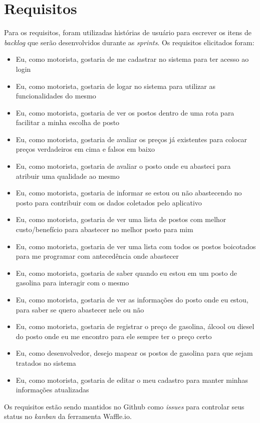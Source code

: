 \section{Requisitos}

Para os requisitos, foram utilizadas histórias de usuário para escrever os itens de \textit{backlog} que serão desenvolvidos durante as \textit{sprints}. Os requisitos elicitados foram:
\begin{itemize}
    \item Eu, como motorista, gostaria de me cadastrar no sistema para ter acesso ao login 
    \item Eu, como motorista, gostaria de logar no sistema para utilizar as funcionalidades do mesmo
    \item Eu, como motorista, gostaria de ver os postos dentro de uma rota para facilitar a minha escolha de posto
    \item Eu, como motorista, gostaria de avaliar os preços já existentes para colocar preços verdadeiros em cima e falsos em baixo
    \item Eu, como motorista, gostaria de avaliar o posto onde eu abasteci para atribuir uma qualidade ao mesmo
    \item Eu, como motorista, gostaria de informar se estou ou não abastecendo no posto para contribuir com os dados coletados pelo aplicativo
    \item Eu, como motorista, gostaria de ver uma lista de postos com melhor custo/benefício para abastecer no melhor posto para mim
    \item Eu, como motorista, gostaria de ver uma lista com todos os postos boicotados para me programar com antecedência onde abastecer
    \item Eu, como motorista, gostaria de saber quando eu estou em um posto de gasolina para interagir com o mesmo
    \item Eu, como motorista, gostaria de ver as informações do posto onde eu estou, para saber se quero abastecer nele ou não
    \item Eu, como motorista, gostaria de registrar o preço de gasolina, álcool ou diesel do posto onde eu me encontro para ele sempre ter o preço certo
    \item Eu, como desenvolvedor, desejo mapear os postos de gasolina para que sejam tratados no sistema
    \item Eu, como motorista, gostaria de editar o meu cadastro para manter minhas informações atualizadas
\end{itemize}
Os requisitos estão sendo mantidos no Github como \textit{issues} para controlar seus status no \textit{kanban} da ferramenta Waffle.io.
